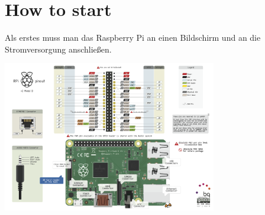 \section{How to start}

Als erstes muss man das Raspberry Pi an einen Bildschirm und an die Stromversorgung anschließen.

\includegraphics[width=0.7\textwidth]{Bilder/raspberry.png} %
